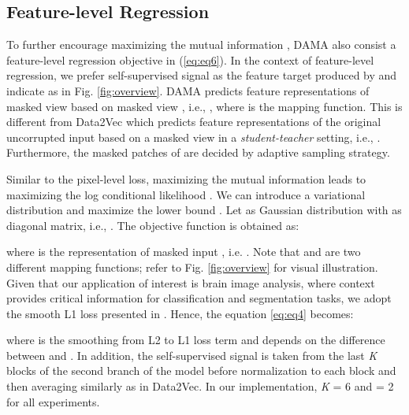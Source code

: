 \documentclass[10pt,twocolumn,letterpaper]{article}
\begin{document}
\subsection{Feature-level Regression}\label{subsec:feature}
To further encourage maximizing the mutual information , DAMA also consist a feature-level regression objective  in (\ref{eq:eq6}). In the context of feature-level regression, we prefer self-supervised signal  as the feature target produced by  and indicate as  in Fig. \ref{fig:overview}. DAMA predicts feature representations of masked view  based on masked view , i.e., , where  is the mapping function. This is different from Data2Vec \cite{data2vec} which predicts feature representations of the original uncorrupted input  based on a masked view  in a \textit{student-teacher} setting, i.e., . Furthermore, the masked patches of  are decided by adaptive sampling strategy.

Similar to the pixel-level loss, maximizing the mutual information  leads to maximizing the log conditional likelihood . We can introduce a variational distribution  and maximize the lower bound . Let  as Gaussian distribution with  as diagonal matrix, i.e., . The objective function is obtained as:

where  is the representation of masked input , i.e. . Note that  and  are two different mapping functions; refer to Fig. \ref{fig:overview} for visual illustration. Given that our application of interest is brain image analysis, where context provides critical information for classification and segmentation tasks, we adopt the smooth L1 loss presented in \cite{data2vec}. Hence, the equation \eqref{eq:eq4} becomes:

where  is the smoothing from L2 to L1 loss term and depends on the difference between  and . In addition, the self-supervised signal  is taken from the last \textit{K} blocks of the second branch of the model before normalization to each block and then averaging similarly as in Data2Vec. In our implementation, \textit{K} =  6 and  = 2 for all experiments.
\end{document}
